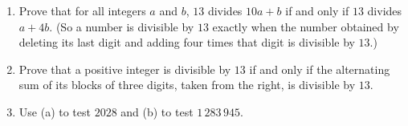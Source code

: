 \begin{enumerate}
\item[(a)] Prove that for all integers $a$ and $b$, $13$ divides $10a+b$ if and only if $13$ divides $a+4b$. (So a number is divisible by $13$ exactly when the number obtained by deleting its last digit and adding four times that digit is divisible by $13$.)
\item[(b)] Prove that a positive integer is divisible by $13$ if and only if the alternating sum of its blocks of three digits, taken from the right, is divisible by $13$.
\item[(c)] Use (a) to test $2028$ and (b) to test $1\,283\,945$.
\end{enumerate}
